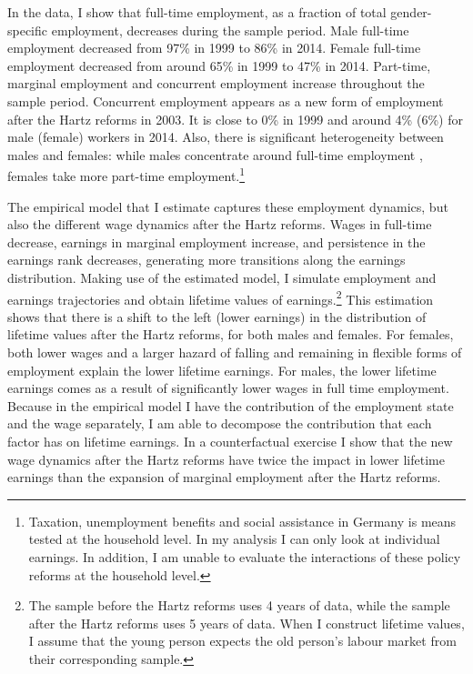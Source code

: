 \documentclass[12pt, a4paper]{article}
\begin{document}


In the data, I show that full-time employment, as a fraction of total \mbox{gender-specific} employment, decreases during the sample period. Male full-time employment decreased from 97\% in 1999 to 86\% in 2014. Female full-time employment decreased from around 65\% in 1999 to 47\% in 2014. Part-time, marginal employment and concurrent employment increase throughout the sample period. Concurrent employment appears as a new form of employment after the Hartz reforms in 2003. It is close to 0\% in 1999 and around 4\% (6\%) for male (female) workers in 2014. Also, there is significant heterogeneity between males and females: while males concentrate around full-time employment , females take more part-time employment.\footnote{Taxation, unemployment benefits and social assistance in Germany is means tested at the household level. In my analysis I can only look at individual earnings. In addition, I am unable to evaluate the interactions of these policy reforms at the household level.}



The empirical model that I estimate captures these employment dynamics, but also the different wage dynamics after the Hartz reforms. Wages in full-time decrease, earnings in marginal employment increase, and persistence in the earnings rank decreases, generating more transitions along the earnings distribution. Making use of the estimated model, I simulate employment and earnings trajectories and obtain lifetime values of earnings.\footnote{The sample before the Hartz reforms uses 4 years of data, while the sample after the Hartz reforms uses 5 years of data. When I construct lifetime values, I assume that the young person expects the old person's labour market from their corresponding sample.} This estimation shows that there is a shift to the left (lower earnings) in the distribution of lifetime values after the Hartz reforms, for both males and females. For females, both lower wages and a larger hazard of falling and remaining in flexible forms of employment explain the lower lifetime earnings. For males, the lower lifetime earnings comes as a result of significantly lower wages in full time employment. Because in the empirical model I have the contribution of the employment state and the wage separately, I am able to decompose the contribution that each factor has on lifetime earnings. In a counterfactual exercise I show that the new wage dynamics after the Hartz reforms have twice the impact in lower lifetime earnings than the expansion of marginal employment after the Hartz reforms.
\end{document}
